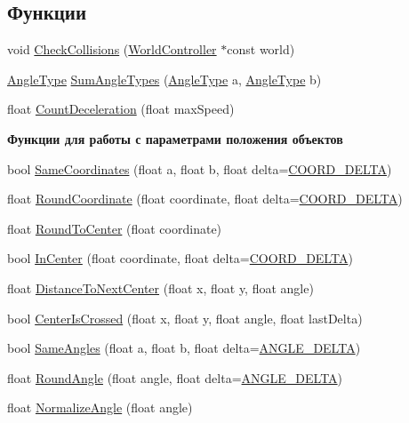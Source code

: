 \subsection*{Функции}
\begin{DoxyCompactItemize}
\item 
void \hyperlink{namespacertm_a1fe2c356e3297343804842a57ce23a4b}{Check\+Collisions} (\hyperlink{classrtm_1_1_world_controller}{World\+Controller} $\ast$const world)
\item 
\hyperlink{namespacertm_a69dc82b16a0148c10962caa83d930f89}{Angle\+Type} \hyperlink{namespacertm_ac1ea2821fc44943e5c35d92e0c9cd5de}{Sum\+Angle\+Types} (\hyperlink{namespacertm_a69dc82b16a0148c10962caa83d930f89}{Angle\+Type} a, \hyperlink{namespacertm_a69dc82b16a0148c10962caa83d930f89}{Angle\+Type} b)
\item 
float \hyperlink{namespacertm_a37715773d85c66ba5c1bf11260836fd0}{Count\+Deceleration} (float max\+Speed)
\end{DoxyCompactItemize}
\begin{Indent}\textbf{ Функции для работы с параметрами положения объектов}\par
\begin{DoxyCompactItemize}
\item 
bool \hyperlink{namespacertm_aa633b82b63b7cff4e9b08bf6a05ec383}{Same\+Coordinates} (float a, float b, float delta=\hyperlink{namespacertm_a9ae158a8873bdf59aa9872cdada6c657}{C\+O\+O\+R\+D\+\_\+\+D\+E\+L\+TA})
\item 
float \hyperlink{namespacertm_a511bf31b8bfc36474baaf915bc11a619}{Round\+Coordinate} (float coordinate, float delta=\hyperlink{namespacertm_a9ae158a8873bdf59aa9872cdada6c657}{C\+O\+O\+R\+D\+\_\+\+D\+E\+L\+TA})
\item 
float \hyperlink{namespacertm_aa2d382c50aa6366b09deaa529d1b3199}{Round\+To\+Center} (float coordinate)
\item 
bool \hyperlink{namespacertm_a030416c27fb4a5896aad3d102083897f}{In\+Center} (float coordinate, float delta=\hyperlink{namespacertm_a9ae158a8873bdf59aa9872cdada6c657}{C\+O\+O\+R\+D\+\_\+\+D\+E\+L\+TA})
\item 
float \hyperlink{namespacertm_aa546266dce0a8d2a50a7fe311e514668}{Distance\+To\+Next\+Center} (float x, float y, float angle)
\item 
bool \hyperlink{namespacertm_a69199b6d204d2ebf33b76e5a7ad52876}{Center\+Is\+Crossed} (float x, float y, float angle, float last\+Delta)
\item 
bool \hyperlink{namespacertm_abf5da499525e88711c6edfb76314f90b}{Same\+Angles} (float a, float b, float delta=\hyperlink{namespacertm_ac78c5105838adb58682cb69a4c66efd7}{A\+N\+G\+L\+E\+\_\+\+D\+E\+L\+TA})
\item 
float \hyperlink{namespacertm_a2c9be06724a54815f6f2f638cf9ae613}{Round\+Angle} (float angle, float delta=\hyperlink{namespacertm_ac78c5105838adb58682cb69a4c66efd7}{A\+N\+G\+L\+E\+\_\+\+D\+E\+L\+TA})
\item 
float \hyperlink{namespacertm_a72a57dbe581a6743525e1920296d42fe}{Normalize\+Angle} (float angle)
\end{DoxyCompactItemize}
\end{Indent}
